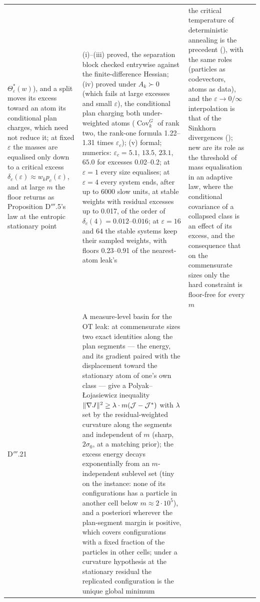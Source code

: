 {\begin{longtable}{@{}>{\raggedright\arraybackslash}p{}>{\raggedright\arraybackslash}p{}%
>{\raggedright\arraybackslash}p{}>{\raggedright\arraybackslash}p{}@{}}
$\Theta^*_\varepsilon(w)$), and a split moves its excess toward an atom its conditional plan charges, which need not
reduce it; at fixed $\varepsilon$ the masses are equalised only down to a critical excess
$\delta_c(\varepsilon)\approx w_kp_c(\varepsilon)$, and at large $m$ the floor returns as Proposition D$'''$.5's law
at the entropic stationary point
& (i)--(iii) proved, the separation block checked entrywise against the finite-difference Hessian; (iv) proved under
$A_k\succ0$ (which fails at large excesses and small $\varepsilon$), the conditional plan charging both
under-weighted atoms ($\operatorname{Cov}^G_k$ of rank two, the rank-one formula 1.22--1.31 times $\varepsilon_c$);
(v) formal; numerics: $\varepsilon_c = 5.1$, $13.5$, $23.1$, $65.0$ for excesses 0.02--0.2; at $\varepsilon = 1$
every size equalises; at $\varepsilon = 4$ every system ends, after up to 6000 slow units, at stable weights with
residual excesses up to 0.017, of the order of $\delta_c(4) = 0.012$--$0.016$; at $\varepsilon = 16$ and $64$ the
stable systems keep their sampled weights, with floors 0.23--0.91 of the nearest-atom leak's
& the critical temperature of deterministic annealing is the precedent (\cite{S46}), with the same roles (particles
as codevectors, atoms as data), and the $\varepsilon\to0/\infty$ interpolation is that of the Sinkhorn divergences
(\cite{S45}); new are its role as the threshold of mass equalisation in an adaptive law, where the conditional
covariance of a collapsed class is an effect of its excess, and the consequence that on the commensurate sizes only
the hard constraint is floor-free for every $m$\\
\addlinespace[0.5pt]
D$'''$.21 & A measure-level basin for the OT leak: at commensurate sizes two exact identities along the plan segments
--- the energy, and its gradient paired with the displacement toward the stationary atom of one's own class --- give
a Polyak--{\L}ojasiewicz inequality $\lVert \nabla J\rVert^2\ge\lambda\cdot m(\mathcal{J} - \mathcal{J}^*)$ with $\lambda$
set by the residual-weighted curvature along the segments and independent of $m$ (sharp, $2\sigma_0$, at a matching
prior); the excess energy decays exponentially from an $m$-independent sublevel set (tiny on the instance: none of
its configurations has a particle in another cell below $m\approx2\cdot10^5$), and a posteriori wherever the
plan-segment margin is positive, which covers configurations with a fixed fraction of the particles in other cells;
under a curvature hypothesis at the stationary residual the replicated configuration is the unique global minimum

\end{longtable}}
